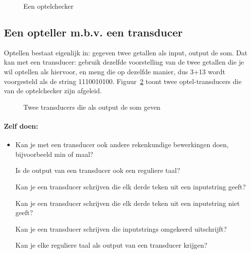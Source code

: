 \begin{figure}[h]
\caption{Een optelchecker \label{telop}}
\end{figure}

\newpage
\subsection{Een opteller m.b.v. een transducer}

Optellen bestaat eigenlijk in: gegeven twee getallen als input, output
de som. Dat kan met een transducer: gebruik dezelfde voorstelling van
de twee getallen die je wil optellen als hiervoor, en meng die op
dezelfde manier, dus 3+13 wordt voorgesteld als de string
1110010100. Figuur~\ref{telop2} toont twee optel-transducers die van de
optelchecker zijn afgeleid.

\begin{figure}[h]
\caption{Twee transducers die als output de som geven \label{telop2}}
\end{figure}

\newpage
\paragraph{Zelf doen:}
\begin{itemize}
\item[]
Kan je met een transducer ook andere rekenkundige bewerkingen doen,
bijvoorbeeld min of maal?

Is de output van een transducer ook een reguliere taal?

Kan je een transducer schrijven die elk derde teken uit een
inputstring geeft?

Kan je een transducer schrijven die elk derde teken uit een
inputstring niet geeft?

Kan je een transducer schrijven die inputstrings omgekeerd uitschrijft?

Kan je elke reguliere taal als output van een transducer krijgen?
\end{itemize}

